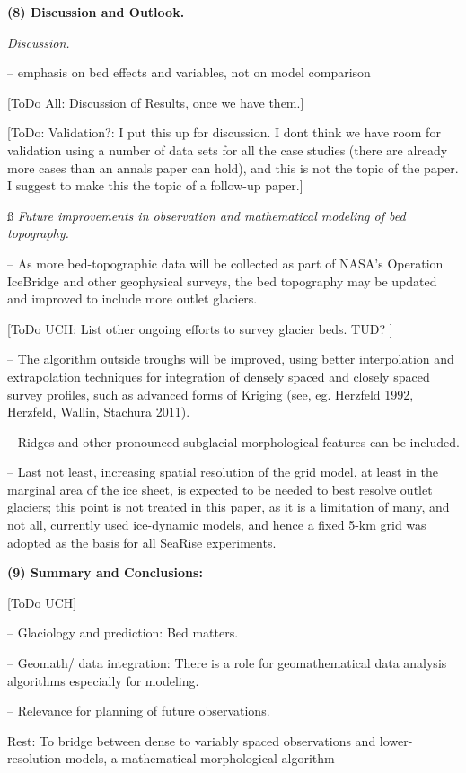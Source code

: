\documentclass[11pt]{article}
\begin{document}
 
 \bs
 {\bf (8) Discussion and Outlook.}
 
 {\it Discussion.} 
 
 
-- emphasis on bed effects and variables, not on model comparison
 
  [ToDo All: Discussion of Results, once we have them.]
 
 [ToDo: Validation?: I put this up for discussion. I dont think we have room for validation using a number of data sets  for all the case studies (there are already more cases than an annals paper can hold), and this is not the topic of the paper. I suggest to make this the topic of a follow-up paper.]
 
 
 \ss
{\it  Future improvements in observation and mathematical modeling of bed topography.}
 
 -- As more bed-topographic data will be collected as part of NASA's Operation IceBridge and other geophysical surveys, the bed topography may be updated and improved to include more outlet glaciers.
 
 [ToDo UCH: List other ongoing efforts to survey glacier beds. TUD? ]
 
 -- The algorithm outside troughs will be improved, using better interpolation and extrapolation techniques
 for integration of densely spaced and closely spaced survey profiles, such as advanced forms of Kriging
 (see, eg. Herzfeld 1992, Herzfeld, Wallin, Stachura 2011).
 
 -- Ridges and other pronounced subglacial morphological features can be included.
 
 -- Last not least, increasing spatial resolution of the grid model, at least in the marginal area of the ice sheet, 
 is expected to be needed to best resolve outlet glaciers; this point is not treated in this paper, as it is a limitation
 of many, and not all,  currently used ice-dynamic models, and hence a fixed 5-km grid was adopted as the
 basis for all SeaRise experiments.
 
 
 {\bf (9) Summary and Conclusions:}
 
  [ToDo UCH]
 
 -- Glaciology and prediction: Bed matters. 
 
 
 -- Geomath/ data integration: There is a role for geomathematical  data analysis algorithms especially for modeling.
 
--  Relevance for planning of future observations.



Rest: To bridge between dense to variably spaced observations and lower-resolution models, 
a mathematical morphological algorithm 
  
\end{document}
